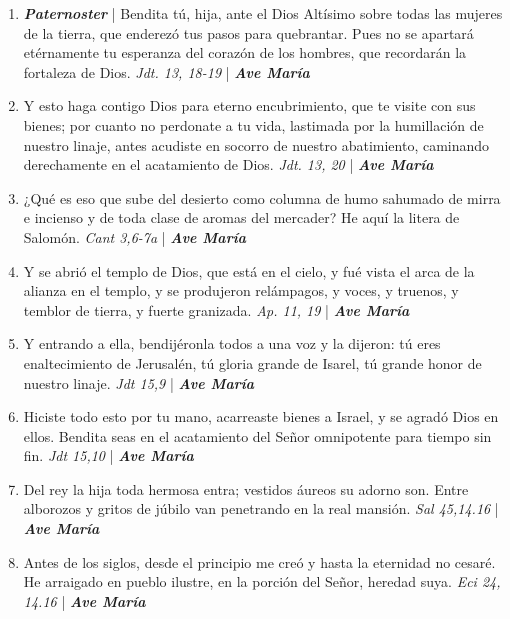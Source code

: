 \documentclass[../../devocionario.tex]{subfiles}
\begin{document}
    \begin{enumerate}
    
        \item \textbf{\textit{Paternoster}} | Bendita tú, hija, ante el Dios Altísimo sobre todas las mujeres de la tierra, 
            que enderezó tus pasos para quebrantar. Pues no se apartará etérnamente tu esperanza del corazón de los hombres, 
            que recordarán la fortaleza de Dios. \textit{Jdt. 13, 18-19} | \textbf{\textit{Ave María}}

        \item Y esto haga contigo Dios para eterno encubrimiento, que te visite con sus bienes; por cuanto no perdonate a tu vida, 
            lastimada por la humillación de nuestro linaje, antes acudiste en socorro de nuestro abatimiento, 
            caminando derechamente en el acatamiento de Dios. \textit{Jdt. 13, 20} | \textbf{\textit{Ave María}}

        \item ¿Qué es eso que sube del desierto como columna de humo sahumado de mirra e incienso y de toda clase de aromas del mercader? 
            He aquí la litera de Salomón. \textit{Cant 3,6-7a} | \textbf{\textit{Ave María}}

        \item Y se abrió el templo de Dios, que está en el cielo, y fué vista el arca de la alianza en el templo, 
            y se produjeron relámpagos, y voces, y truenos, y temblor de tierra, y fuerte granizada. \textit{Ap. 11, 19} | \textbf{\textit{Ave María}}

        \item Y entrando a ella, bendijéronla todos a una voz y la dijeron: tú eres enaltecimiento de Jerusalén, 
            tú gloria grande de Isarel, tú grande honor de nuestro linaje. \textit{Jdt 15,9} | \textbf{\textit{Ave María}}

        \item Hiciste todo esto por tu mano, acarreaste bienes a Israel, y se agradó Dios en ellos. 
            Bendita seas en el acatamiento del Señor omnipotente para tiempo sin fin. \textit{Jdt 15,10} | \textbf{\textit{Ave María}}

        \item Del rey la hija toda hermosa entra; vestidos áureos su adorno son. Entre alborozos y gritos de 
            júbilo van penetrando en la real mansión. \textit{Sal 45,14.16} | \textbf{\textit{Ave María}}

        \item Antes de los siglos, desde el principio me creó y hasta la eternidad no cesaré. 
            He arraigado en pueblo ilustre, en la porción del Señor, heredad suya. \textit{Eci 24, 14.16} | \textbf{\textit{Ave María}}


\end{enumerate}
\end{document}
